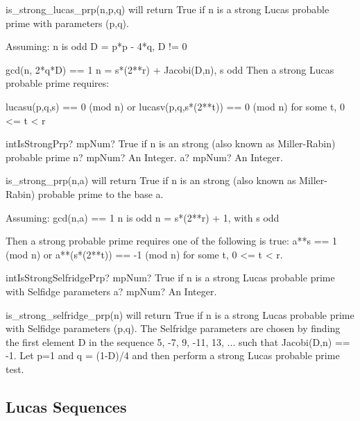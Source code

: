 is\_strong\_lucas\_prp(n,p,q) will return True if n is a strong Lucas probable prime with
parameters (p,q).

Assuming:
n is odd
D = p*p - 4*q, D != 0

gcd(n, 2*q*D) == 1
n = s*(2**r) + Jacobi(D,n), s odd
Then a strong Lucas probable prime requires:

lucasu(p,q,s) == 0 (mod n)
or
lucasv(p,q,s*(2**t)) == 0 (mod n) for some t, 0 <= t < r







\vspace{0.6cm}
\begin{mpFunctionsExtract}
	\mpFunctionTwo
	{intIsStrongPrp? mpNum? True if n is an strong (also known as Miller-Rabin) probable prime}
	{n? mpNum? An Integer.}
	{a? mpNum? An Integer.}
\end{mpFunctionsExtract}

\vspace{0.3cm}

is\_strong\_prp(n,a) will return True if n is an strong (also known as Miller-Rabin) probable prime
to the base a.

Assuming:
gcd(n,a) == 1
n is odd
n = s*(2**r) + 1, with s odd

Then a strong probable prime requires one of the following is true:
a**s == 1 (mod n)
or
a**(s*(2**t)) == -1 (mod n) for some t, 0 <= t < r.



\vspace{0.6cm}
\begin{mpFunctionsExtract}
	\mpFunctionOne
	{intIsStrongSelfridgePrp? mpNum? True if n is a strong Lucas probable prime with Selfidge parameters}
	{a? mpNum? An Integer.}
\end{mpFunctionsExtract}

\vspace{0.3cm}

is\_strong\_selfridge\_prp(n) will return True if n is a strong Lucas probable prime with Selfidge
parameters (p,q). The Selfridge parameters are chosen by finding the first element D in the
sequence {5, -7, 9, -11, 13, ...} such that Jacobi(D,n) == -1. Let p=1 and q = (1-D)/4 and then
perform a strong Lucas probable prime test.



\subsection{Lucas Sequences}

